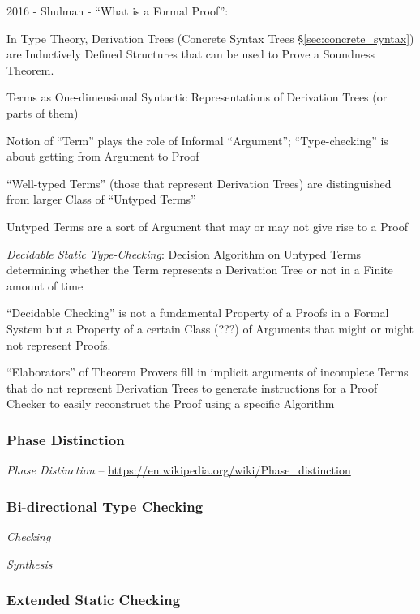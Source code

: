 2016 - Shulman - ``What is a Formal Proof'': %

In Type Theory, Derivation Trees (Concrete Syntax Trees
\S\ref{sec:concrete_syntax}) are Inductively Defined Structures that
can be used to Prove a Soundness Theorem.

Terms as One-dimensional Syntactic Representations of Derivation Trees
(or parts of them)

Notion of ``Term'' plays the role of Informal ``Argument'';
``Type-checking'' is about getting from Argument to Proof

``Well-typed Terms'' (those that represent Derivation Trees) are
distinguished from larger Class of ``Untyped Terms''

Untyped Terms are a sort of Argument that may or may not give rise to
a Proof

\emph{Decidable Static Type-Checking}: Decision Algorithm on Untyped
Terms determining whether the Term represents a Derivation Tree or not
in a Finite amount of time

``Decidable Checking'' is not a fundamental Property of a Proofs in a
Formal System but a Property of a certain Class (???) of Arguments
that might or might not represent Proofs.

``Elaborators'' of Theorem Provers fill in implicit arguments of
incomplete Terms that do not represent Derivation Trees to generate
instructions for a Proof Checker to easily reconstruct the Proof using
a specific Algorithm



\subsubsection{Phase Distinction}\label{sec:phase_distinction}

\emph{Phase Distinction} --
\url{https://en.wikipedia.org/wiki/Phase_distinction}



\subsubsection{Bi-directional Type Checking}
\label{sec:bidirectional_checking}

\emph{Checking}

\emph{Synthesis}



\subsubsection{Extended Static Checking}\label{sec:extended_static}

